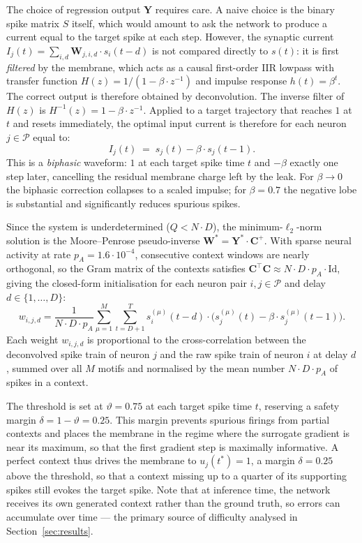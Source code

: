 \documentclass{scrartcl}
\begin{document}
The choice of regression output $\mathbf{Y}$ requires care. A naive choice is the binary spike matrix $S$ itself, which would amount to ask the network to produce a current equal to the target spike at each step. However, the synaptic current $I_j(t) = \sum_{i,d} \mathbf{W}_{j,i,d} \cdot s_i(t-d)$ is not compared directly to $s(t)$: it is first \emph{filtered} by the membrane, which acts as a causal first-order IIR lowpass with transfer function $H(z) = 1/(1 - \beta \cdot z^{-1})$ and impulse response $h(t) = \beta^t$. The correct output is therefore obtained by deconvolution.  The inverse filter of $H(z)$ is $H^{-1}(z) = 1 - \beta \cdot z^{-1}$. Applied to a target trajectory that reaches $1$ at $t$ and resets immediately, the optimal input current is therefore for each neuron $j \in \mathcal{P}$ equal to:
\begin{equation}
  I_j(t) \;=\; s_j(t) - \beta \cdot s_j(t-1).
  \label{eq:deconv_target}
\end{equation}
This is a \emph{biphasic} waveform: $1$ at each target spike time $t$ and $-\beta$ exactly one step later, cancelling the residual membrane charge left by the leak. For $\beta \to 0$ the biphasic correction collapses to a scaled impulse; for $\beta = 0.7$ the negative lobe is substantial and significantly reduces spurious spikes.

Since the system is underdetermined ($Q < N \cdot D$), the minimum-$\ell_2$-norm solution is the Moore--Penrose pseudo-inverse $\mathbf{W}^* = \mathbf{Y}^* \cdot \mathbf{C}^+$. With sparse neural activity at rate $p_A = 1.6\cdot 10^{-4}$, consecutive context windows are nearly orthogonal, so the Gram matrix of the contexts satisfies $\mathbf{C}^\top\mathbf{C} \approx N \cdot D \cdot p_A \cdot \mathrm{Id}$, giving the closed-form initialisation for each neuron pair $i, j \in \mathcal{P}$ and delay $d \in \{1, \ldots, D\}$:
\begin{equation}
  w_{i, j, d}
  = \frac{1}{N \cdot D \cdot p_A}
    \sum_{\mu=1}^{M}\sum_{t=D+1}^{T}
    s_i^{(\mu)}(t-d)
    \cdot
    \bigl(s_j^{(\mu)}(t) - \beta \cdot s_j^{(\mu)}(t-1)\bigr).
  \label{eq:init}
\end{equation}
Each weight $w_{i, j, d}$ is proportional to the cross-correlation between the deconvolved spike train of neuron $j$ and the raw spike train of neuron $i$ at delay $d$, summed over all $M$ motifs and normalised by the mean number $N \cdot D \cdot p_A$ of spikes in a context.

The threshold is set at $\vartheta = 0.75$ at each target spike time $t$, reserving a safety margin $\delta = 1 - \vartheta = 0.25$. This margin prevents spurious firings from partial contexts and places the membrane in the regime where the surrogate gradient is near its maximum, so that the first gradient step is maximally informative. A perfect context thus drives the membrane to $u_j(t^*) = 1$, a margin $\delta = 0.25$ above the threshold, so that a context missing up to a quarter of its supporting spikes still evokes the target spike. Note that at inference time, the network receives its own generated context rather than the ground truth, so errors can accumulate over time --- the primary source of difficulty analysed in Section~\ref{sec:results}.
\end{document}
